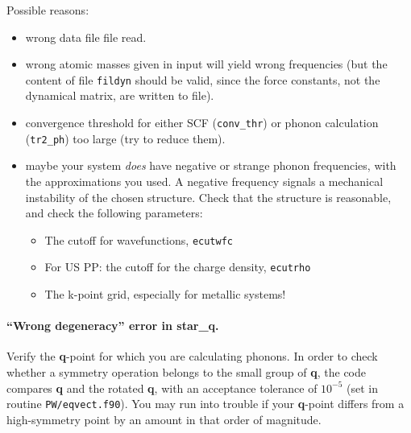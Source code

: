 \documentclass[12pt,a4paper]{article}
\begin{document}
Possible reasons:
\begin{itemize}
  \item
    wrong data file file read.
  \item
    wrong atomic masses given in input will yield wrong frequencies
    (but the content of file {\tt fildyn} should be valid, since the
    force constants, not the dynamical matrix, are written to file).
  \item
    convergence threshold for either SCF ({\tt conv\_thr}) or phonon
    calculation ({\tt tr2\_ph}) too large (try to reduce them).
  \item
    maybe your system \emph{does} have negative or strange phonon
    frequencies, with the approximations you used.
    A negative frequency signals a mechanical instability of the
    chosen structure.
    Check that the structure is reasonable, and check the following
    parameters:
    \begin{itemize}
      \item The cutoff for wavefunctions, \texttt{ecutwfc}
      \item For US PP: the cutoff for the charge density,
            \texttt{ecutrho}
      \item The k-point grid, especially for metallic systems!
    \end{itemize}
\end{itemize}

\paragraph{``Wrong degeneracy'' error in star\_q.}

Verify the \textbf{q}-point for which you are calculating phonons.
In order to check whether a symmetry operation belongs to the small
group of \textbf{q}, the code compares \textbf{q} and the rotated
\textbf{q}, with an acceptance tolerance of $10^{-5}$ (set in routine
\texttt{PW/eqvect.f90}).
You may run into trouble if your \textbf{q}-point differs from a
high-symmetry point by an amount in that order of magnitude.
\end{document}

